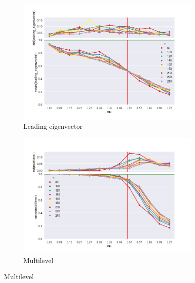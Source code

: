 \begin{figure}
    \begin{subfigure}[b]{0.32\textwidth}
        \includegraphics[width=\textwidth]{fig/nmi_vs_mu_leading_eigenvector}
        \caption{Leading eigenvector}
        \label{fig:tiger}
    \end{subfigure}
    \qquad
    \begin{subfigure}[b]{0.32\textwidth}
        \includegraphics[width=\textwidth]{fig/nmi_vs_mu_multilevel}
        \caption{Multilevel}
        \label{fig:mouse}
    \end{subfigure}


\end{figure}
